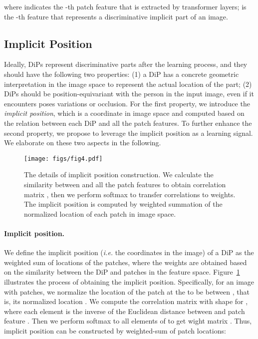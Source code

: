 \documentclass[10pt,twocolumn,letterpaper]{article}
\begin{document}
where  indicates the -th patch feature that is extracted by transformer layers;  is the -th feature that represents a discriminative implicit part of an image.




\subsection{Implicit Position}
\label{sec:position}

Ideally, DiPs represent discriminative parts after the learning process, and they should have the following two properties: (1) a DiP has a concrete geometric interpretation in the image space to represent the actual location of the part; (2) DiPs should be position-equivariant with the person in the input image, even if it encounters poses variations or occlusion. 
For the first property, we introduce the \textit{implicit position}, which is a coordinate in image space and computed based on the relation between each DiP and all the patch features.
To further enhance the second property, we propose to leverage the implicit position as a learning signal.
We elaborate on these two aspects in the following.


\begin{figure}
\setlength{\abovecaptionskip}{-0.2cm}
\begin{center}
    \texttt{[image: figs/fig4.pdf]}
\end{center}
   \caption{The details of implicit position construction. We calculate the similarity between  and all the patch features to obtain correlation matrix , then we perform softmax to transfer correlations to weights. The implicit position is computed by weighted summation of the normalized location of each patch in image space.}
\label{fig:implicit-pos}
\end{figure}

\vspace{-0.4cm}
\paragraph{Implicit position.} 
We define the implicit position (\textit{i.e.} the coordinates in the image) of a DiP as the weighted sum of locations of the patches, where the weights are obtained based on the similarity between the DiP and patches in the feature space.
Figure~\ref{fig:implicit-pos} illustrates the process of obtaining the implicit position. Specifically, for an image with  patches, we normalize the location of the patch at the  to be between , that is, its normalized location . We compute the correlation matrix  with shape  for , where each element  is the inverse of the Euclidean distance between  and patch feature . Then we perform softmax to all elements of  to get wight matrix . Thus, implicit position  can be constructed by weighted-sum of patch locations:
\end{document}
